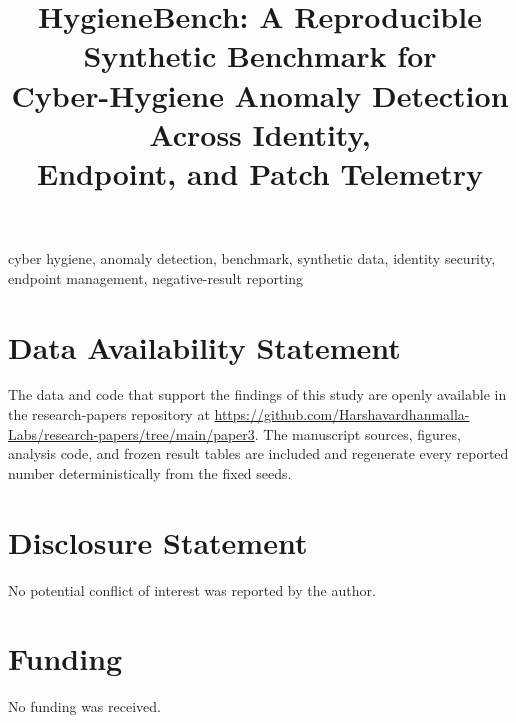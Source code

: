 \documentclass[journal]{IEEEtran}
\title{HygieneBench: A Reproducible Synthetic Benchmark for\\
Cyber-Hygiene Anomaly Detection Across Identity,\\
Endpoint, and Patch Telemetry}
\author{%
  \IEEEauthorblockN{Harshavardhan Malla}
  \IEEEauthorblockA{Independent Researcher\\
  Email: \href{mailto:harshavardhanmalla75@gmail.com}{harshavardhanmalla75@gmail.com}}%
}
\begin{document}
\maketitle
\sloppy

\begin{abstract}

\end{abstract}

\begin{IEEEkeywords}
cyber hygiene, anomaly detection, benchmark, synthetic data, identity security, endpoint management, negative-result reporting
\end{IEEEkeywords}









\section*{Data Availability Statement}
The data and code that support the findings of this study are openly available in the research-papers repository at \url{https://github.com/Harshavardhanmalla-Labs/research-papers/tree/main/paper3}. The manuscript sources, figures, analysis code, and frozen result tables are included and regenerate every reported number deterministically from the fixed seeds.

\section*{Disclosure Statement}
No potential conflict of interest was reported by the author.

\section*{Funding}
No funding was received.
\end{document}
